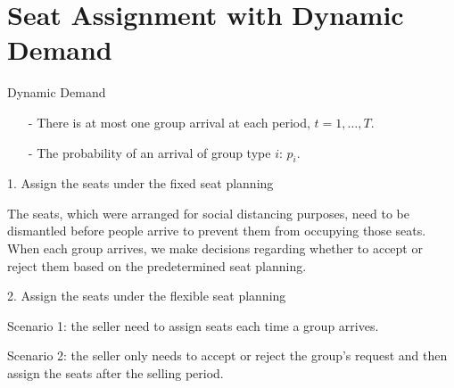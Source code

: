 
\section{Seat Assignment with Dynamic Demand}
    \frame{\sectionpage}

\begin{frame}{Dynamic Demand}
  \begin{itemize}
    \item[-] There is at most one group arrival at each period, $t = 1, \ldots, T$. 
    \item[-] The probability of an arrival of group type $i$: $p_i$.  
  \end{itemize}

  1. Assign the seats under the {\color{red}fixed seat planning}

  \begin{footnotesize}
    The seats, which were arranged for social distancing purposes, need to be dismantled before people arrive to prevent them from occupying those seats. When each group arrives, we make decisions regarding whether to accept or reject them based on the predetermined seat planning.
  \end{footnotesize}

  \vspace{0.3cm}

  2. Assign the seats under the {\color{red}flexible seat planning}

  \begin{footnotesize}
  Scenario 1: the seller need to assign seats each time a group arrives. 
  
  Scenario 2: the seller only needs to accept or reject the group's request and then assign the seats after the selling period.
  \end{footnotesize}
\end{frame}

